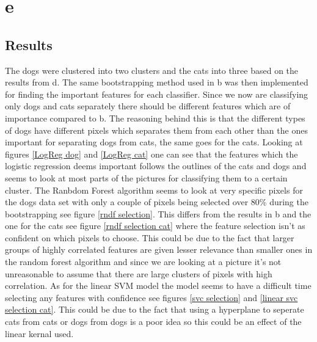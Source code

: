 \documentclass{article}
\begin{document}
\section{e}
\subsection{Results}
The dogs were clustered into two clusters and the cats into three based on the results from d. The same bootstrapping method used in b was then implemented for finding the important features for each classifier. Since we now are classifying only dogs and cats separately there should be different features which are of importance compared to b. The reasoning behind this is that the different types of dogs have different pixels which separates them from each other than the ones important for separating dogs from cats, the same goes for the cats. Looking at figures \ref{LogReg dog} and \ref{LogReg cat} one can see that the features which the logistic regression deems important follows the outlines of the cats and dogs and seems to look at most parts of the pictures for classifying them to a certain cluster. The Ranbdom Forest algorithm seems to look at very specific pixels for the dogs data set with only a couple of pixels being selected over 80\% during the bootstrapping see figure \ref{rndf selection}. This differs from the results in b and the one for the cats see figure \ref{rndf selection cat} where the feature selection isn't as confident on which pixels to choose. This could be due to the fact that larger groups of highly correlated features are given lesser relevance than smaller ones in the random forest algorithm and since we are looking at a picture it's not unreasonable to assume that there are large clusters of pixels with high correlation. As for the linear SVM model the model seems to have a difficult time selecting any features with confidence see figures \ref{svc selection} and \ref{linear svc selection cat}. This could be due to the fact that using a hyperplane to seperate cats from cats or dogs from dogs is a poor idea so this could be an effect of the linear kernal used. 
\end{document}
